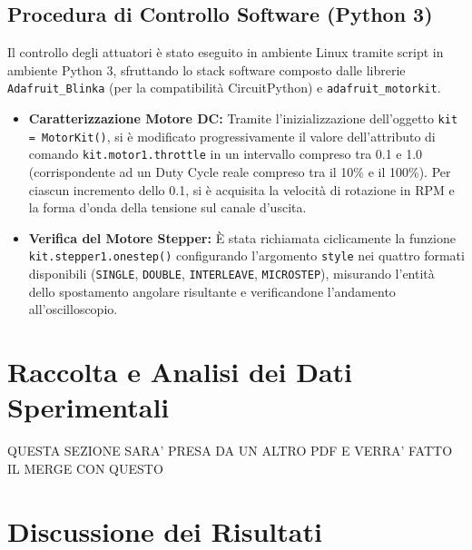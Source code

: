 \documentclass{article}
\begin{document}
\subsection{Procedura di Controllo Software (Python 3)}
Il controllo degli attuatori è stato eseguito in ambiente Linux tramite script in ambiente Python 3, sfruttando lo stack software composto dalle librerie \texttt{Adafruit\_Blinka} (per la compatibilità CircuitPython) e \texttt{adafruit\_motorkit}.

\begin{itemize}
\item \textbf{Caratterizzazione Motore DC:} Tramite l'inizializzazione dell'oggetto \texttt{kit = MotorKit()}, si è modificato progressivamente il valore dell'attributo di comando \texttt{kit.motor1.throttle} in un intervallo compreso tra 0.1 e 1.0 (corrispondente ad un Duty Cycle reale compreso tra il 10\% e il 100\%). Per ciascun incremento dello 0.1, si è acquisita la velocità di rotazione in RPM e la forma d'onda della tensione sul canale d'uscita.
\item \textbf{Verifica del Motore Stepper:} È stata richiamata ciclicamente la funzione \texttt{kit.stepper1.onestep()} configurando l'argomento \texttt{style} nei quattro formati disponibili (\texttt{SINGLE}, \texttt{DOUBLE}, \texttt{INTERLEAVE}, \texttt{MICROSTEP}), misurando l'entità dello spostamento angolare risultante e verificandone l'andamento all'oscilloscopio.
\end{itemize}
\newpage

\section{Raccolta e Analisi dei Dati Sperimentali}
  QUESTA SEZIONE SARA' PRESA DA UN ALTRO PDF E VERRA' FATTO IL MERGE CON QUESTO

\newpage

\section{Discussione dei Risultati}
\end{document}
